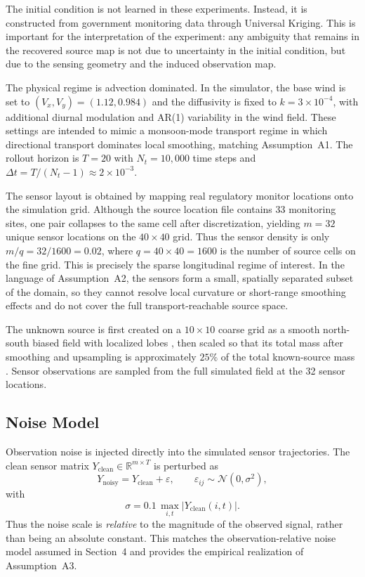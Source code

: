 The initial condition is not learned in these experiments. Instead, it is constructed from government monitoring data \citep{cpcb,cpcb_portal} through Universal Kriging. This is important for the interpretation of the experiment: any ambiguity that remains in the recovered source map is not due to uncertainty in the initial condition, but due to the sensing geometry and the induced observation map.

The physical regime is advection dominated. In the simulator, the base wind is set to $(V_x,V_y)=(1.12,0.984)$ and the diffusivity is fixed to $k=3\times 10^{-4}$, with additional diurnal modulation and AR(1) variability in the wind field. These settings are intended to mimic a monsoon-mode transport regime in which directional transport dominates local smoothing, matching Assumption~A1. The rollout horizon is $T=20$ with $N_t=10{,}000$ time steps and $\Delta t = T/(N_t-1) \approx 2\times 10^{-3}$.

The sensor layout is obtained by mapping real regulatory monitor locations onto the simulation grid. Although the source location file contains 33 monitoring sites, one pair collapses to the same cell after discretization, yielding $m=32$ unique sensor locations on the $40\times 40$ grid. Thus the sensor density is only $m/q = 32/1600 = 0.02$, where $q=40\times 40=1600$ is the number of source cells on the fine grid. This is precisely the sparse longitudinal regime of interest. In the language of Assumption~A2, the sensors form a small, spatially separated subset of the domain, so they cannot resolve local curvature or short-range smoothing effects and do not cover the full transport-reachable source space.

The unknown source is first created on a $10\times 10$ coarse grid as a smooth north-south biased field with localized lobes \citep{bhardwaj2025comprehensive}, then scaled so that its total mass after smoothing and upsampling is approximately $25\%$ of the total known-source mass \citep{GUTTIKUNDA2013101}. Sensor observations are sampled from the full simulated field at the 32 sensor locations.

\subsection{Noise Model}
\label{subsec:noise_model}

Observation noise is injected directly into the simulated sensor trajectories. The clean sensor matrix $Y_{\mathrm{clean}} \in \mathbb{R}^{m\times T}$ is perturbed as
\begin{equation}
Y_{\mathrm{noisy}} = Y_{\mathrm{clean}} + \varepsilon,
\qquad
\varepsilon_{ij} \sim \mathcal{N}(0,\sigma^2), \nonumber
\end{equation}
with
\begin{equation}
\sigma = 0.1\,\max_{i,t} |Y_{\mathrm{clean}}(i,t)|. \nonumber
\end{equation}
Thus the noise scale is \emph{relative} to the magnitude of the observed signal, rather than being an absolute constant. This matches the observation-relative noise model assumed in Section~4 and provides the empirical realization of Assumption~A3.


